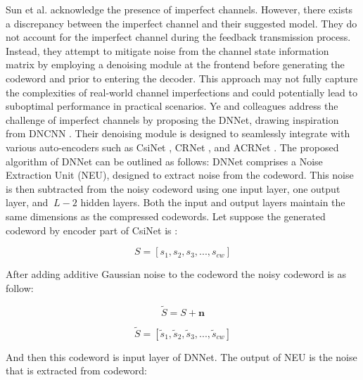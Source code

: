 \documentclass[lettersize,journal]{IEEEtran}
\begin{document}
Sun et al. \cite{sun2020ancinet} acknowledge the presence of imperfect channels. However, there exists a discrepancy between the imperfect channel and their suggested model. They do not account for the imperfect channel during the feedback transmission process. Instead, they attempt to mitigate noise from the channel state information matrix by employing a denoising module at the frontend before generating the codeword and prior to entering the decoder. This approach may not fully capture the complexities of real-world channel imperfections and could potentially lead to suboptimal performance in practical scenarios.
Ye and colleagues \cite{abw} address the challenge of imperfect channels by proposing the DNNet, drawing inspiration from DNCNN \cite{ccc1}. Their denoising module is designed to seamlessly integrate with various auto-encoders such as CsiNet \cite{abe}, CRNet \cite{abn}, and ACRNet \cite{aby}.
The proposed algorithm of DNNet can be outlined as follows:
DNNet comprises a Noise Extraction Unit (NEU), designed to extract noise from the codeword. This noise is then subtracted from the noisy codeword using one input layer, one output layer, and 
\begin{math} \ L-2 \end{math} hidden layers. Both the input and output layers maintain the same dimensions as the compressed codewords. Let suppose the generated codeword by encoder part of CsiNet is :

\begin{equation}
		S=[s_{1},s_{2},s_{3},...,s_{cw}]
\end{equation}

After adding additive Gaussian noise to the codeword the noisy codeword is as follow:

\begin{equation}
		\tilde{S}=S+\textbf{n}
\end{equation}



\begin{equation}
		\tilde{S}=[\tilde{s}_{1},\tilde{s}_{2},\tilde{s}_{3},...,\tilde{s}_{cw}]
\end{equation}

And then this codeword is input layer of DNNet. The output of NEU is the noise that is extracted from codeword:
\end{document}
